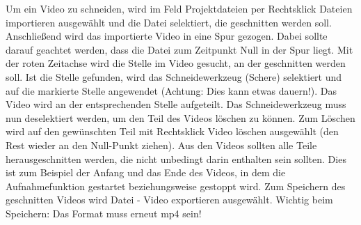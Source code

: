 Um ein Video zu schneiden, wird im Feld Projektdateien per Rechtsklick Dateien importieren ausgewählt und die Datei selektiert, die geschnitten werden soll. Anschließend wird das importierte Video in eine Spur gezogen. Dabei sollte darauf geachtet werden, dass die Datei zum Zeitpunkt Null in der Spur liegt. Mit der roten Zeitachse wird die Stelle im Video gesucht, an der geschnitten werden soll. Ist die Stelle gefunden, wird das Schneidewerkzeug (Schere) selektiert und auf die markierte Stelle angewendet (Achtung: Dies kann etwas dauern!). Das Video wird an der entsprechenden Stelle aufgeteilt. Das Schneidewerkzeug muss nun deselektiert werden, um den Teil des Videos löschen zu können. Zum Löschen wird auf den gewünschten Teil mit Rechtsklick Video löschen ausgewählt (den Rest wieder an den Null-Punkt ziehen). Aus den Videos sollten alle Teile herausgeschnitten werden, die nicht unbedingt darin enthalten sein sollten. Dies ist zum Beispiel der Anfang und das Ende des Videos, in dem die Aufnahmefunktion gestartet beziehungsweise gestoppt wird. Zum Speichern des geschnitten Videos wird Datei - Video exportieren ausgewählt. Wichtig beim Speichern: Das Format muss erneut mp4 sein!


